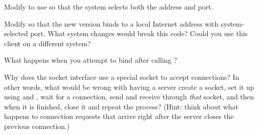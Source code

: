 \begin{exercises}
\item Modify  to use  so that the system
selects both the address and port.

\item Modify  so that the new version binds to a
local Internet address with system-selected port.  What system changes would
break this code? Could you use this client on a different system?

\item What happens when you attempt to bind after calling ?

\item
Why does the socket interface use a special socket to accept
connections?  In other words, what would be wrong with having a server
create a socket, set it up using  and
, wait for a connection, send and receive through
\emph{that\/} socket, and then when it is finished, close it and
repeat the process?  (Hint: think about what happens to connection
requests that arrive right after the server closes the previous connection.)
\end{exercises}

